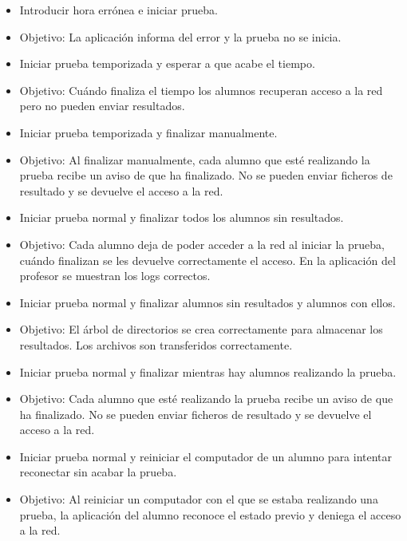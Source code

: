 \begin{itemize}
    \item Introducir hora errónea e iniciar prueba.
    \item Objetivo: La aplicación informa del error y la prueba no se inicia.
    \newline

    \item Iniciar prueba temporizada y esperar a que acabe el tiempo.
    \item Objetivo: Cuándo finaliza el tiempo los alumnos recuperan acceso a la red pero no pueden enviar resultados.
    \newline

    \item Iniciar prueba temporizada y finalizar manualmente.
    \item Objetivo: Al finalizar manualmente, cada alumno que esté realizando la prueba recibe un aviso de que ha finalizado. No se pueden enviar ficheros de resultado y se devuelve el acceso a la red.
    \newline


    \item Iniciar prueba normal y finalizar todos los alumnos sin resultados.
    \item Objetivo: Cada alumno deja de poder acceder a la red al iniciar la prueba, cuándo finalizan se les devuelve correctamente el acceso. En la aplicación del profesor se muestran los logs correctos.
    \newline

    \item Iniciar prueba normal y finalizar alumnos sin resultados y alumnos con ellos.
    \item Objetivo: El árbol de directorios se crea correctamente para almacenar los resultados. Los archivos son transferidos correctamente.
    \newline

    \item Iniciar prueba normal y finalizar mientras hay alumnos realizando la prueba.
    \item Objetivo: Cada alumno que esté realizando la prueba recibe un aviso de que ha finalizado. No se pueden enviar ficheros de resultado y se devuelve el acceso a la red.
    \newline


    \item Iniciar prueba normal y reiniciar el computador de un alumno para intentar reconectar sin acabar la prueba.
    \item Objetivo: Al reiniciar un computador con el que se estaba realizando una prueba, la aplicación del alumno reconoce el estado previo y deniega el acceso a la red.
    \newline


\end{itemize}
